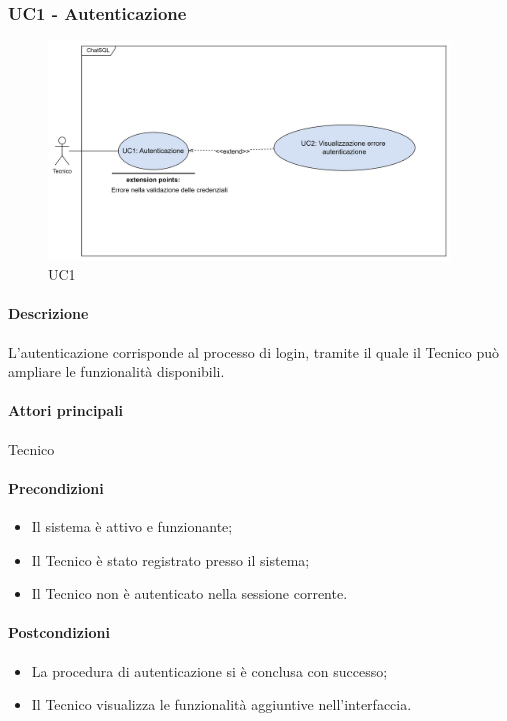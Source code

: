 \subsubsection{UC1 - Autenticazione}\label{UC1}

\begin{figure}[H]
  \centering
  \includegraphics[width=0.95\textwidth]{assets/uc1.png}
  \caption{UC1}
\end{figure}

\paragraph*{Descrizione}
L'autenticazione corrisponde al processo di login, tramite il quale il Tecnico può ampliare le funzionalità disponibili.

\paragraph*{Attori principali}
Tecnico

\paragraph*{Precondizioni}
\begin{itemize}
  \item Il sistema è attivo e funzionante;
  \item Il Tecnico è stato registrato presso il sistema;
  \item Il Tecnico non è autenticato nella sessione corrente.
\end{itemize}

\paragraph*{Postcondizioni}
\begin{itemize}
  \item La procedura di autenticazione si è conclusa con successo;
  \item Il Tecnico visualizza le funzionalità aggiuntive nell'interfaccia.  
\end{itemize}

